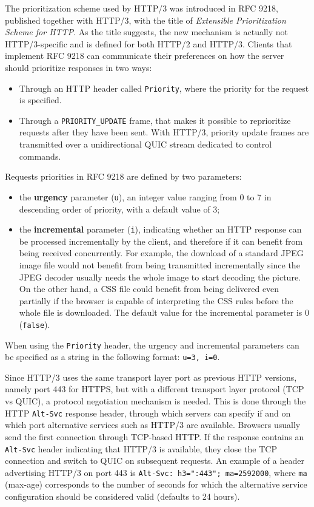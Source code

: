 The prioritization scheme used by HTTP/3 was introduced in RFC 9218, published together with HTTP/3, with the title of \textit{Extensible Prioritization Scheme for HTTP}. As the title suggests, the new mechanism is actually not HTTP/3-specific and is defined for both HTTP/2 and HTTP/3. Clients that implement RFC 9218 can communicate their preferences on how the server should prioritize responses in two ways:\cite{rfc9218}

\begin{itemize}
    \item Through an HTTP header called \texttt{Priority}, where the priority for the request is specified.
    \item Through a \texttt{PRIORITY\_UPDATE} frame, that makes it possible to reprioritize requests after they have been sent. With HTTP/3, priority update frames are transmitted over a unidirectional QUIC stream dedicated to control commands.
\end{itemize}

Requests priorities in RFC 9218 are defined by two parameters:

\begin{itemize}
    \item the \textbf{urgency} parameter (\texttt{u}), an integer value ranging from 0 to 7 in descending order of priority, with a default value of 3;
    \item the \textbf{incremental} parameter (\texttt{i}), indicating whether an HTTP response can be processed incrementally by the client, and therefore if it can benefit from being received concurrently. For example, the download of a standard JPEG image file would not benefit from being transmitted incrementally since the JPEG decoder usually needs the whole image to start decoding the picture. On the other hand, a CSS file could benefit from being delivered even partially if the browser is capable of interpreting the CSS rules before the whole file is downloaded. The default value for the incremental parameter is 0 (\texttt{false}).
\end{itemize}

When using the \texttt{Priority} header, the urgency and incremental parameters can be specified as a string in the following format: \texttt{u=3, i=0}.

Since HTTP/3 uses the same transport layer port as previous HTTP versions, namely port 443 for HTTPS, but with a different transport layer protocol (TCP vs QUIC), a protocol negotiation mechanism is needed. This is done through the HTTP \texttt{Alt-Svc} response header, through which servers can specify if and on which port alternative services such as HTTP/3 are available. Browsers usually send the first connection through TCP-based HTTP. If the response contains an \texttt{Alt-Svc} header indicating that HTTP/3 is available, they close the TCP connection and switch to QUIC on subsequent requests. An example of a header advertising HTTP/3 on port 443 is \verb|Alt-Svc: h3=":443"; ma=2592000|, where \texttt{ma} (max-age) corresponds to the number of seconds for which the alternative service configuration should be considered valid (defaults to 24 hours).

